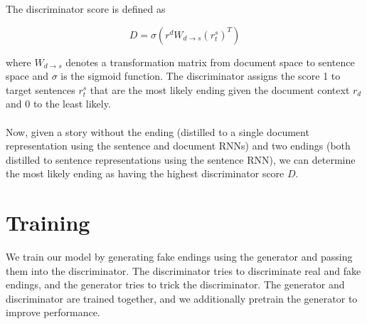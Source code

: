 \documentclass{article}
\begin{document}
The discriminator score is defined as 

$$ D = \sigma(r^{d}W_{d \rightarrow s}(r^{s}_{t})^{T} )$$

where $W_{d \rightarrow s}$ denotes a transformation matrix from document space to sentence space and $\sigma$ is the sigmoid function. The discriminator assigns the score 1 to target sentences $r^{s}_{t}$ that are the most likely ending given the document context $r_{d}$ and 0 to the least likely. \\
\\
Now, given a story without the ending (distilled to a single document representation using the sentence and document RNNs) and two endings (both distilled to sentence representations using the sentence RNN), we can determine the most likely ending as having the highest discriminator score $D$. 

\section{Training}

We train our model by generating fake endings using the generator and passing them into the discriminator. The discriminator tries to discriminate real and fake endings, and the generator tries to trick the discriminator. The generator and discriminator are trained together, and we additionally pretrain the generator to improve performance.
\end{document}

